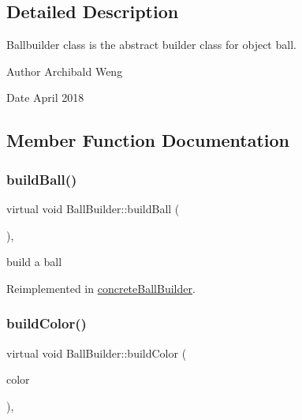 \subsection{Detailed Description}
Ballbuilder class is the abstract builder class for object ball. 

\begin{DoxyAuthor}{Author}
Archibald Weng 
\end{DoxyAuthor}
\begin{DoxyDate}{Date}
April 2018 
\end{DoxyDate}


\subsection{Member Function Documentation}
\mbox{\label{class_ball_builder_a5dc064067607fa4ef22db5901cca9e62}} 
\subsubsection{\texorpdfstring{build\+Ball()}{buildBall()}}
{\footnotesize\ttfamily virtual void Ball\+Builder\+::build\+Ball (\begin{DoxyParamCaption}{ }\end{DoxyParamCaption})\hspace{0.3cm}{\ttfamily [inline]}, {\ttfamily [virtual]}}

build a ball 

Reimplemented in \mbox{\hyperlink{classconcrete_ball_builder_a882e6217ebab232ee2a3d0af63c43b5a}{concrete\+Ball\+Builder}}.

\mbox{\label{class_ball_builder_a0cd696c49074e3923a76ec8aed10ad45}} 
\subsubsection{\texorpdfstring{build\+Color()}{buildColor()}}
{\footnotesize\ttfamily virtual void Ball\+Builder\+::build\+Color (\begin{DoxyParamCaption}\item[{Q\+String}]{color }\end{DoxyParamCaption})\hspace{0.3cm}{\ttfamily [inline]}, {\ttfamily [virtual]}}

